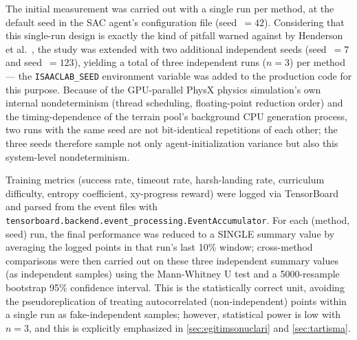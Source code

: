 The initial measurement was carried out with a single run per method, at
the default seed in the SAC agent's configuration file (seed~$=42$).
Considering that this single-run design is exactly the kind of pitfall
warned against by Henderson et al.\ \citep{henderson2018deep}, the study
was extended with two additional independent seeds (seed~$=7$ and
seed~$=123$), yielding a total of three independent runs ($n=3$) per
method --- the \texttt{ISAACLAB\_SEED} environment variable was added to
the production code for this purpose. Because of the GPU-parallel PhysX
physics simulation's own internal nondeterminism (thread scheduling,
floating-point reduction order) and the timing-dependence of the terrain
pool's background CPU generation process, two runs with the same seed
are not bit-identical repetitions of each other; the three seeds
therefore sample not only agent-initialization variance but also this
system-level nondeterminism.

Training metrics (success rate, timeout rate, harsh-landing rate,
curriculum difficulty, entropy coefficient, xy-progress reward) were
logged via TensorBoard and parsed from the event files with
\texttt{tensorboard.backend.event\_processing.EventAccumulator}. For
each (method, seed) run, the final performance was reduced to a SINGLE
summary value by averaging the logged points in that run's last 10\%
window; cross-method comparisons were then carried out on these three
independent summary values (as independent samples) using the
Mann-Whitney U test and a 5000-resample bootstrap 95\% confidence
interval. This is the statistically correct unit, avoiding the
pseudoreplication of treating autocorrelated (non-independent) points
within a single run as fake-independent samples; however, statistical
power is low with $n=3$, and this is explicitly emphasized in
\cref{sec:egitimsonuclari} and \cref{sec:tartisma}.
